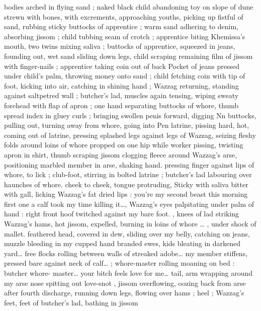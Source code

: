 bodies arched in flying sand ; naked black child abandoning toy on 
slope of dune strewn with bones, with excrements, approaching 
youths, picking up fistful of sand, rubbing sticky buttocks of 
apprentice ; warm sand adhering to denim, absorbing jissom ; child 
tubbing seam of crotch ; apprentice biting Khemissa's mouth, two 
twins mixing saliva ; buttocks of apprentice, squeezed in jeans, 
founding out, wet sand sliding down legs, child scraping remaining 
film of jissom with finger-nails ; apprentice taking coin out of back 
Pocket of jeans pressed under child's palm, throwing money onto 
sand ; child fetching coin with tip of foot, kicking into air, catching in 
shining hand ; Wazzag returning, standing against saltpetred wall ; 
butcher's lad, muscles again tensing, wiping sweaty forehead with 
flap of apron ; one hand separating buttocks of whore, thumb spread 
index in gluey curls ; bringing swollen penis forward, digging 
Nn buttocks, pulling out, turning away from whore, going into 
Pen latrine, pissing hard, hot, coming out of latrine, pressing 
splashed legs against legs of Wazzag, seizing fleshy folds around 
loins of whore propped on one hip while worker pissing, twisting 
apron in shirt, thumb scraping jissom clogging fleece around 
Wazzag's arse, positioning marbled member in arse, shaking hand. 
pressing finger against lips of whore, to lick ; club-foot, stirring in 
bolted latrine ; butcher's lad labouring over haunches of whore. 
cheek to cheek, tongue protruding, Sticky with saliva bitter with gall, 
licking Wazzag's fat dried lips : {\gl}{\td} you're my second beast this 
morning{\td} first one a calf{\td} took my time killing it{\ldots}{\gr}, Wazzag's eyes 
palpitating under palm of hand : {\gl}{\td} right front hoof twitched against 
my bare foot. {\gr}, knees of lad striking Wazzag's hams, hot jissom, 
expelled, burning in loins of whore {\ldots} {\gl}, under shock of mallet. 
feathered head, covered in dew, sliding over my belly, catching on 
jeans, muzzle bleeding in my cupped hand{\td} branded ewes, kids 
bleating in darkened yard{\ldots} free flocks rolling between walls of 
streaked adobe{\ldots} my member stiffens, pressed bare against neck of 
calf{\ldots}{\gr} ; whore-master rolling moaning on bed : {\gl} butcher{\td} whore- 
master{\ldots} your bitch feels love for me{\ldots} tail, arm wrapping around my 
arse{\td} nose spitting out love-snot{\td} {\gr}, jissom overflowing, oozing back 
from arse after fourth discharge, running down legs, flowing over 
hams ; heel ; Wazzag's feet, feet of butcher's lad, bathing in jissom 
